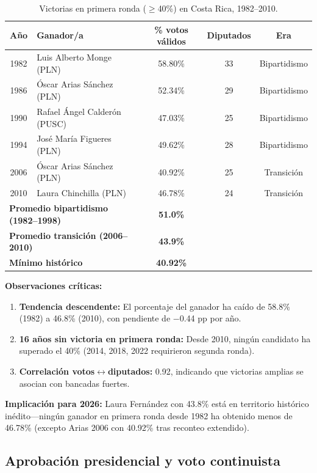 \documentclass[11pt,a4paper]{article}
\begin{document}
\begin{table}[H]
\centering
\caption{Victorias en primera ronda ($\geq$40\%) en Costa Rica, 1982--2010.}
\label{tab:victorias_1r}
\begin{tabular}{@{}clccc@{}}
\toprule
\textbf{Año} & \textbf{Ganador/a} & \textbf{\% votos válidos} & \textbf{Diputados} & \textbf{Era} \\
\midrule
1982 & Luis Alberto Monge (PLN) & 58.80\% & 33 & Bipartidismo \\
1986 & Óscar Arias Sánchez (PLN) & 52.34\% & 29 & Bipartidismo \\
1990 & Rafael Ángel Calderón (PUSC) & 47.03\% & 25 & Bipartidismo \\
1994 & José María Figueres (PLN) & 49.62\% & 28 & Bipartidismo \\
2006 & Óscar Arias Sánchez (PLN) & 40.92\% & 25 & Transición \\
2010 & Laura Chinchilla (PLN) & 46.78\% & 24 & Transición \\
\midrule
\multicolumn{2}{l}{\textbf{Promedio bipartidismo (1982--1998)}} & \textbf{51.0\%} & & \\
\multicolumn{2}{l}{\textbf{Promedio transición (2006--2010)}} & \textbf{43.9\%} & & \\
\multicolumn{2}{l}{\textbf{Mínimo histórico}} & \textbf{40.92\%} & & \\
\bottomrule
\end{tabular}
\end{table}

\textbf{Observaciones críticas:}
\begin{enumerate}
    \item \textbf{Tendencia descendente:} El porcentaje del ganador ha caído de 58.8\% (1982) a 46.8\% (2010), con pendiente de $-$0.44 pp por año.
    \item \textbf{16 años sin victoria en primera ronda:} Desde 2010, ningún candidato ha superado el 40\% (2014, 2018, 2022 requirieron segunda ronda).
    \item \textbf{Correlación votos$\leftrightarrow$diputados:} 0.92, indicando que victorias amplias se asocian con bancadas fuertes.
\end{enumerate}

\textbf{Implicación para 2026:} Laura Fernández con 43.8\% está en territorio histórico inédito---ningún ganador en primera ronda desde 1982 ha obtenido menos de 46.78\% (excepto Arias 2006 con 40.92\% tras reconteo extendido).

\subsection{Aprobación presidencial y voto continuista}
\end{document}
